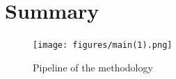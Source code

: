 \section{Summary}


\begin{figure}[H]

  \texttt{[image: figures/main(1).png]}
  \caption{Pipeline of the methodology}
  
  \label{fig:pipeline_1}  
\end{figure}
